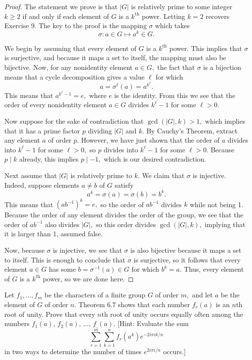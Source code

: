 \begin{proof}
The statement we prove is that $|G|$ is relatively prime to some integer $k\ge2$ if and only if each element of $G$ is a $k^{\text{th}}$ power. Letting $k=2$ recovers Exercise 9. The key to the proof is the mapping $\sigma$ which takes
\[\sigma:a\in G\longmapsto a^k\in G.\]

We begin by assuming that every element of $G$ is a $k^\text{th}$ power. This implies that $\sigma$ is surjective, and because it maps a set to itself, the mapping must also be bijective. Now, for any nonidentity element $a\in G,$ the fact that $\sigma$ is a bijection means that a cycle decomposition gives a value $\ell$ for which
\[a=\sigma^\ell(a)=a^{k^\ell}.\]
This means that $a^{k^\ell-1}=e,$ where $e$ is the identity. From this we see that the order of every nonidentity element $a\in G$ divides $k^\ell-1$ for some $\ell>0.$

Now suppose for the sake of contradiction that $\gcd(|G|,k)>1,$ which implies that it has a prime factor $p$ dividing $|G|$ and $k.$ By Cauchy's Theorem, extract any element $a$ of order $p.$ However, we have just shown that the order of $a$ divides into $k^\ell-1$ for some $\ell>0,$ so $p$ divides into $k^\ell-1$ for some $\ell>0.$ Because $p\mid k$ already, this implies $p\mid-1,$ which is our desired contradiction.

Next assume that $|G|$ is relatively prime to $k.$ We claim that $\sigma$ is injective. Indeed, suppose elements $a\ne b$ of $G$ satisfy
\[a^k=\sigma(a)=\sigma(b)=b^k.\]
This means that $\left(ab^{-1}\right)^k=e,$ so the order of $ab^{-1}$ divides $k$ while not being 1. Because the order of any element divides the order of the group, we see that the order of $ab^{-1}$ also divides $|G|,$ so this order divides $\gcd(|G|,k),$ implying that it is larger than 1, assumed false.

Now, because $\sigma$ is injective, we see that $\sigma$ is also bijective because it maps a set to itself. This is enough to conclude that $\sigma$ is surjective, so it follows that every element $a\in G$ has some $b=\sigma^{-1}(a)\in G$ for which $b^k=a.$ Thus, every element of $G$ is a $k^\text{th}$ power, so we are done here.
\end{proof}

\begin{exercise}[13]
Let $f_1,\ldots,f_m$ be the characters of a finite group $G$ of order $m,$ and let $a$ be the element of $G$ of order $n.$ Theorem 6.7 shows that each number $f_r(a)$ is an $n$th root of unity. Prove that every $n$th root of unity occurs equally often among the numbers $f_1(a),\,f_2(a),\,\ldots,\,f_,(a).$ [Hint: Evaluate the sum
\[\sum_{r=1}^m\sum_{k=1}^nf_r\left(a^k\right)e^{-2i\pi ik/n}\]
in two ways to determine the number of times $e^{2i\pi i/n}$ occurs.]
\end{exercise}

